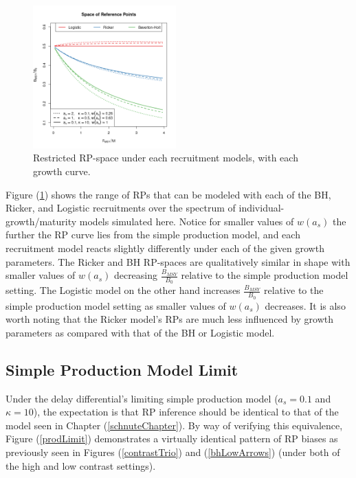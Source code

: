 %
\begin{figure}
\vspace{-0.5cm}
\includegraphics[width=0.49\textwidth]{../ddBias/rpTriptic.png}
\vspace{-0.75cm}
\caption{Restricted RP-space under each recruitment models,
with each growth curve.}\label{rpTriptic}
\end{figure}
%
Figure (\ref{rpTriptic}) shows the range of RPs that can be modeled with each
of the BH, Ricker, and Logistic recruitments over the spectrum of
individual-growth/maturity models simulated here. Notice for smaller values of 
$w(a_s)$ the further the RP curve lies from the simple production model,
and each recruitment model reacts slightly differently under each of the given growth
parameters. The Ricker and BH RP-spaces are qualitatively similar in shape
with smaller values of $w(a_s)$ decreasing $\frac{B_{MSY}}{B_0}$ relative to the
simple production model setting. The Logistic model on the other hand increases
$\frac{B_{MSY}}{B_0}$ relative to the simple production model setting as smaller 
values of $w(a_s)$ decreases. It is also worth noting that the Ricker model's
RPs are much less influenced by growth parameters as compared with that of the
BH or Logistic model.

%
\clearpage
%
\subsection{Simple Production Model Limit}

%
Under the delay differential's limiting simple production model ($a_s=0.1$ and $\kappa=10$),
the expectation is that RP inference should be identical to that of the model seen in
Chapter (\ref{schnuteChapter}). By way of verifying this equivalence, Figure (\ref{prodLimit})
demonstrates a virtually identical pattern of RP biases as previously seen in
Figures (\ref{contrastTrio}) and (\ref{bhLowArrows}) (under both of the high and
low contrast settings).


